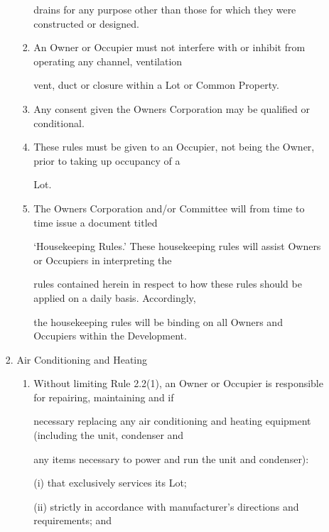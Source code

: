 \documentclass{article}
\begin{document}
\begin{enumerate}[label=\arabic*.]
\begin{enumerate}[label=\arabic{enumi}.\arabic*.]
\begin{enumerate}[label=(\arabic*)]
\begin{enumerate}[label=(\alph*)]
{\fontsize{10.02}{1}drains for any purpose other than those for which they were constructed or designed. }

\item {\fontsize{9.962}{1} An Owner or Occupier must not interfere with or inhibit from operating any channel, ventilation }

{\fontsize{10.02}{1}vent, duct or closure within a Lot or Common Property. }

\item {\fontsize{9.962}{1} Any consent given the Owners Corporation may be qualified or conditional. }

\item {\fontsize{9.962}{1} These rules must be given to an Occupier, not being the Owner, prior to taking up occupancy of a }

{\fontsize{10.02}{1}Lot. }

\item {\fontsize{9.962}{1} The Owners Corporation and/or Committee will from time to time issue a document titled }

{\fontsize{10.02}{1}‘Housekeeping Rules.’ These housekeeping rules will assist Owners or Occupiers in interpreting the }

{\fontsize{10.02}{1}rules contained herein in respect to how these rules should be applied on a daily basis. Accordingly, }

{\fontsize{10.02}{1}the housekeeping rules will be binding on all Owners and Occupiers within the Development. }

\end{enumerate}
\item {\fontsize{9.962}{1} Air Conditioning and Heating }

\begin{enumerate}[label=(\alph*)]
\item {\fontsize{9.962}{1} Without limiting Rule 2.2(1), an Owner or Occupier is responsible for repairing, maintaining and if }

{\fontsize{10.02}{1}necessary replacing any air conditioning and heating equipment (including the unit, condenser and }

{\fontsize{10.02}{1}any items necessary to power and run the unit and condenser): }

{\fontsize{9.962}{1}(i) that exclusively services its Lot; }

{\fontsize{9.962}{1}(ii) strictly in accordance with manufacturer’s directions and requirements; and }


\end{enumerate}
\end{enumerate}
\end{enumerate}
\end{enumerate}
\end{document}
